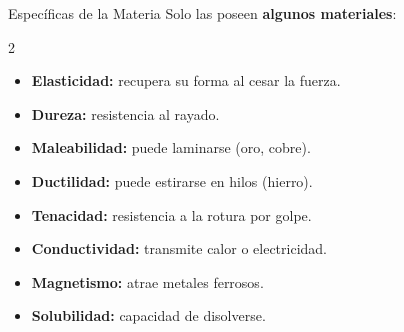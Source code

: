 \documentclass[11pt]{article}
\begin{document}
	\begin{propbox}{Espec\'ificas de la Materia}
		Solo las poseen \textbf{algunos materiales}:
		\begin{multicols}{2}
			\begin{itemize}[itemsep=3pt]
				\item \textbf{Elasticidad:} recupera su forma al cesar la fuerza.
				\item \textbf{Dureza:} resistencia al rayado.
				\item \textbf{Maleabilidad:} puede laminarse (oro, cobre).
				\item \textbf{Ductilidad:} puede estirarse en hilos (hierro).
				\item \textbf{Tenacidad:} resistencia a la rotura por golpe.
				\item \textbf{Conductividad:} transmite calor o electricidad.
				\item \textbf{Magnetismo:} atrae metales ferrosos.
				\item \textbf{Solubilidad:} capacidad de disolverse.
			\end{itemize}
		\end{multicols}
	\end{propbox}
\end{document}
